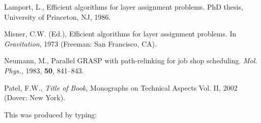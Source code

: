 \documentclass{rQUF2e}
\theoremstyle{plain}
\theoremstyle{definition}
\theoremstyle{remark}
\begin{document}
\begin{thebibliography}{99}
Lamport, L., Efficient algorithms for layer assignment problems.
 PhD thesis, University of Princeton, NJ, 1986.

Misner, C.W. (Ed.), Efficient algorithms for layer assignment problems. In {\itshape Gravitation},
 1973 (Freeman: San Francisco, CA).

Neumann, M., Parallel GRASP with path-relinking for job shop scheduling. {\itshape Mol. Phys.,} 1983,
 {\bfseries 50}, 841--843.

Patel, F.W., {\itshape Title of Book}, Monographs on Technical Aspects Vol. II,
 2002 (Dover: New York).

\end{thebibliography}
\bigskip
\noindent This was produced by typing:
\end{document}
